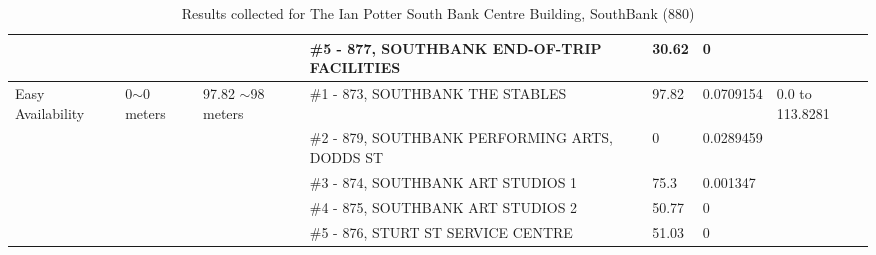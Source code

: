 \begin{table}[H]
{\begin{tabular}{|l|l|l|l|l|l|l|}
                   &                            &                                                 & \#5 - 877, SOUTHBANK END-OF-TRIP FACILITIES           & 30.62         & 0               &                           \\ \hline
Easy Availability  & 0$\sim$0 meters            & 97.82 $\sim$98 meters                           & \#1 - 873, SOUTHBANK THE STABLES                      & 97.82         & 0.0709154       & 0.0 to 113.8281           \\ \hline
                   &                            &                                                 & \#2 - 879, SOUTHBANK PERFORMING ARTS, DODDS ST        & 0             & 0.0289459       &                           \\ \hline
                   &                            &                                                 & \#3 - 874, SOUTHBANK ART STUDIOS 1                    & 75.3          & 0.001347        &                           \\ \hline
                   &                            &                                                 & \#4 - 875, SOUTHBANK ART STUDIOS 2                    & 50.77         & 0               &                           \\ \hline
                   &                            &                                                 & \#5 - 876, STURT ST SERVICE CENTRE                    & 51.03         & 0               &                           \\ \hline
\end{tabular}


}
\caption{Results collected for The Ian Potter South Bank Centre Building, SouthBank (880)}
\label{appendix:sth-ian}
\end{table}

